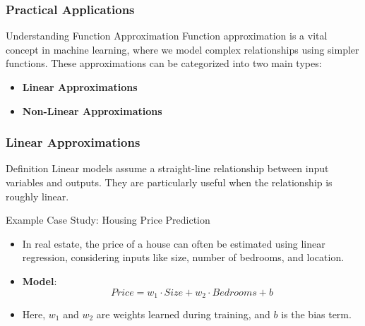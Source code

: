 \documentclass[aspectratio=169]{beamer}
\begin{document}
\begin{frame}[fragile]
    \frametitle{Practical Applications}
    \begin{block}{Understanding Function Approximation}
        Function approximation is a vital concept in machine learning, where we model complex relationships using simpler functions. 
        These approximations can be categorized into two main types:
        \begin{itemize}
            \item \textbf{Linear Approximations}
            \item \textbf{Non-Linear Approximations}
        \end{itemize}
    \end{block}
\end{frame}

\begin{frame}[fragile]
    \frametitle{Linear Approximations}
    \begin{block}{Definition}
        Linear models assume a straight-line relationship between input variables and outputs. They are particularly useful when the relationship is roughly linear.
    \end{block}
    
    \begin{block}{Example Case Study: Housing Price Prediction}
        \begin{itemize}
            \item In real estate, the price of a house can often be estimated using linear regression, considering inputs like size, number of bedrooms, and location.
            \item \textbf{Model}:
            \begin{equation}
                Price = w_1 \cdot Size + w_2 \cdot Bedrooms + b
            \end{equation}
            \item Here, $w_1$ and $w_2$ are weights learned during training, and $b$ is the bias term.
        \end{itemize}
    \end{block}
\end{frame}
\end{document}
